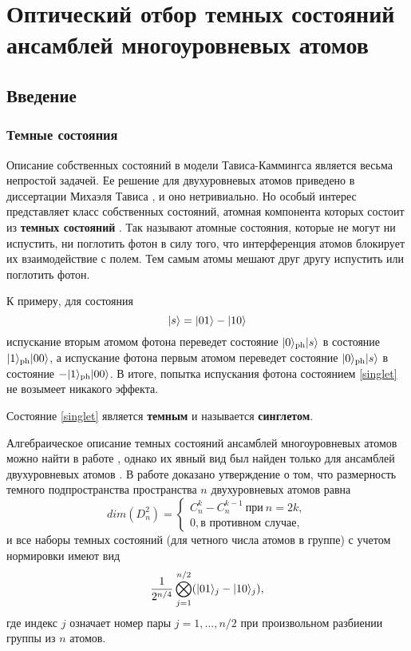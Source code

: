 \chapter{Оптический отбор темных состояний ансамблей многоуровневых атомов}\label{ch:ch3}

\section{Введение}\label{sec:ch3/sect1}

\subsection{Темные состояния}\label{subsec:ch3/subsect1}

Описание собственных состояний в модели Тависа-Каммингса является весьма непростой задачей. Ее решение для двухуровневых атомов приведено в диссертации Михаэля Тависа \cite{tavis_2}, и оно нетривиально. Но особый интерес представляет класс собственных состояний, атомная компонента которых состоит из \textbf{темных состояний} \cite{ozhigov_dimension}. Так называют атомные состояния, которые не могут ни испустить, ни поглотить фотон в силу того, что интерференция атомов блокирует их взаимодействие с полем. Тем самым атомы мешают друг другу испустить или поглотить фотон.

К примеру, для состояния
\begin{equation}\label{singlet}
	|s\rangle = |01\rangle - |10\rangle
\end{equation}
испускание вторым атомом фотона переведет состояние  $|0\rangle_{\text{ph}}|s\rangle$ в состояние $|1\rangle_{\text{ph}}|00\rangle$, а испускание фотона первым атомом переведет состояние  $|0\rangle_{\text{ph}}|s\rangle$ в состояние $-|1\rangle_{\text{ph}}|00\rangle$. В итоге, попытка испускания фотона состоянием \eqref{singlet} не возымеет никакого эффекта.

Состояние \eqref{singlet} является \textbf{темным} и называется \textbf{синглетом}.

Алгебраическое описание темных состояний ансамблей многоуровневых атомов можно найти в работе \cite{kok}, однако их явный вид был найден только для ансамблей двухуровневых атомов \cite{ozhigov_dimension}. В работе \cite{ozhigov_dimension} доказано утверждение о том, что размерность темного подпространства пространства $n$ двухуровневых атомов равна
\[
dim(D_{n}^2) =	
\begin{cases}
	C_{n}^{k} - C_{n}^{k-1}~\text{при}~n = 2k, \\
	0, \text{в противном случае},
\end{cases}
\]
и все наборы темных состояний (для четного числа атомов в группе) с учетом нормировки имеют вид 
\[
\frac{1}{2^{n/4}}\bigotimes_{j=1}^{n/2}(|01\rangle_{j}-|10\rangle_{j}),
\]
где индекс $j$ означает номер пары $j = 1,\dots, n/2$ при произвольном разбиении группы из $n$ атомов.

